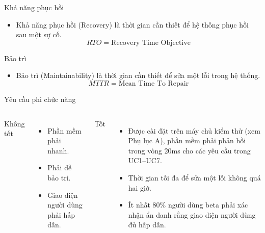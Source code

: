 \begin{frame}{Khả năng phục hồi}
    \begin{block}{}
        \begin{itemize}
            \item Khả năng phục hồi (Recovery) là thời gian cần thiết
            để hệ thống phục hồi sau một sự cố.
            \[RTO = \text{Recovery Time Objective}\]
        \end{itemize}
    \end{block}
\end{frame}

\begin{frame}{Bảo trì}
    \begin{block}{}
        \begin{itemize}
            \item Bảo trì (Maintainability) là thời gian cần thiết
            để sửa một lỗi trong hệ thống.
            \[MTTR = \text{Mean Time To Repair}\]
        \end{itemize}
    \end{block}
\end{frame}

\begin{frame}{Yêu cầu phi chức năng}
    \begin{columns}
        {\Huge \color{red}Không tốt}
        \begin{itemize}
            \item Phần mềm phải nhanh.
            \item Phải dễ bảo trì.
            \item Giao diện người dùng phải hấp dẫn.
        \end{itemize}
        {\Huge \color{blue}Tốt}
        \begin{itemize}
            \item Được cài đặt trên máy chủ kiểm thử (xem Phụ lục A),
            phần mềm phải phản hồi trong vòng 20ms
            cho các yêu cầu trong UC1--UC7.
            \item Thời gian tối đa để sửa một lỗi
            không quá hai giờ.
            \item Ít nhất 80\% người dùng beta phải xác nhận
            ẩn danh rằng giao diện người dùng đủ hấp dẫn.
        \end{itemize}
    \end{columns}
\end{frame}

